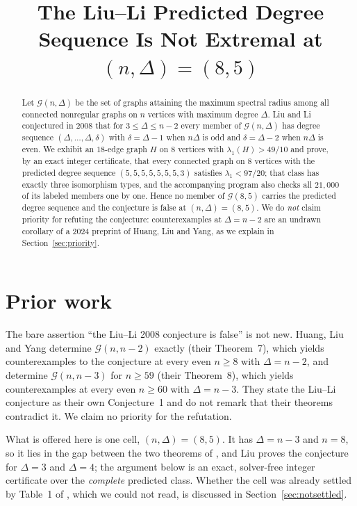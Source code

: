 \documentclass[11pt]{amsart}
\title[The Liu--Li predicted degree sequence at $(8,5)$]{The Liu--Li Predicted
Degree Sequence Is Not Extremal at
\texorpdfstring{$(n,\Delta)=(8,5)$}{(n,Delta)=(8,5)}}
\date{}
\theoremstyle{definition}
\begin{document}
\begin{abstract}
Let $\mathcal{G}(n,\Delta)$ be the set of graphs attaining the maximum spectral
radius among all connected nonregular graphs on $n$ vertices with maximum degree
$\Delta$. Liu and Li conjectured in 2008 that for $3\le\Delta\le n-2$ every
member of $\mathcal{G}(n,\Delta)$ has degree sequence
$(\Delta,\dots,\Delta,\delta)$ with $\delta=\Delta-1$ when $n\Delta$ is odd and
$\delta=\Delta-2$ when $n\Delta$ is even. We exhibit an $18$-edge graph $H$ on
$8$ vertices with $\lambda_1(H)>49/10$ and prove, by an exact integer
certificate, that every connected graph on $8$ vertices with the predicted
degree sequence $(5,5,5,5,5,5,5,3)$ satisfies $\lambda_1<97/20$; that class has
exactly three isomorphism types, and the accompanying program also checks all
$21{,}000$ of its labeled members one by one. Hence no member of
$\mathcal{G}(8,5)$ carries the predicted degree sequence and the conjecture is
false at $(n,\Delta)=(8,5)$. We do \emph{not} claim priority for refuting the
conjecture: counterexamples at $\Delta=n-2$ are an undrawn corollary of a 2024
preprint of Huang, Liu and Yang, as we explain in Section~\ref{sec:priority}.
\end{abstract}

\maketitle

\section{Prior work}\label{sec:priority}

The bare assertion ``the Liu--Li 2008 conjecture is false'' is not new. Huang,
Liu and Yang \cite{HLY} determine $\mathcal{G}(n,n-2)$ exactly (their
Theorem~7), which yields counterexamples to the conjecture at every even
$n\ge 8$ with $\Delta=n-2$, and determine $\mathcal{G}(n,n-3)$ for $n\ge 59$
(their Theorem~8), which yields counterexamples at every even $n\ge 60$ with
$\Delta=n-3$. They state the Liu--Li conjecture as their own Conjecture~1 and do
not remark that their theorems contradict it. We claim no priority for the
refutation.

What is offered here is one cell, $(n,\Delta)=(8,5)$. It has $\Delta=n-3$ and
$n=8$, so it lies in the gap between the two theorems of \cite{HLY}, and Liu
\cite{Liu2024} proves the conjecture for $\Delta=3$ and $\Delta=4$; the argument
below is an exact, solver-free integer certificate over the \emph{complete}
predicted class. Whether the cell was already settled by
Table~1 of \cite{LSW2007}, which we could not read, is discussed in
Section~\ref{sec:notsettled}.
\end{document}
